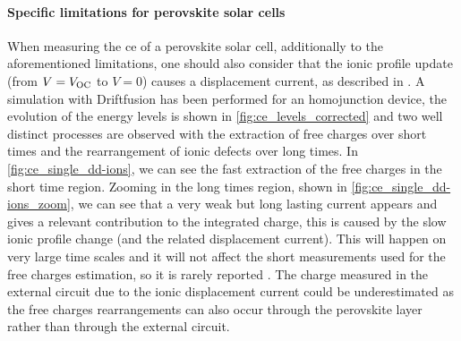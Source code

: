 \begin{figure}
\end{figure}

	\paragraph{Specific limitations for perovskite solar cells} \label{ce_limitations_perovskite}
	When measuring the \gls{ce} of a perovskite solar cell, additionally to the aforementioned limitations, one should also consider that the ionic profile update (from $V=V_\mathrm{OC}$ to $V=0$) causes a displacement current, as described in .
	A simulation with Driftfusion has been performed for an homojunction device, the evolution of the energy levels is shown in \cref{fig:ce_levels_corrected} and two well distinct processes are observed with the extraction of free charges over short times and the rearrangement of ionic defects over long times.
	In \cref{fig:ce_single_dd-ions}, we can see the fast extraction of the free charges in the short time region.
	Zooming in the long times region, shown in \cref{fig:ce_single_dd-ions_zoom}, we can see that a very weak but long lasting current appears and gives a relevant contribution to the integrated charge, this is caused by the slow ionic profile change (and the related displacement current).
	This will happen on very large time scales and it will not affect the short measurements used for the free charges estimation, so it is rarely reported \cite{ORegan2015b}.
	The charge measured in the external circuit due to the ionic displacement current could be underestimated as the free charges rearrangements can also occur through the perovskite layer rather than through the external circuit.

